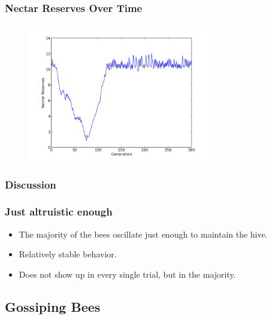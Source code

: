 \documentclass{beamer}
\begin{document}
        \begin{frame}[t]\frametitle{Nectar Reserves Over Time}
          \begin{figure}
          \includegraphics[width=8cm]{recurrent_bees_nectar.png}
          \end{figure}
        \end{frame}

      \subsubsection{Discussion} %
      \label{ssub:discussion}
        \begin{frame}[c]\frametitle{Just altruistic enough}
            
          \begin{itemize}
            \item The majority of the bees oscillate just enough to maintain 
                  the hive.
            \item Relatively stable behavior.
            \item Does not show up in every single trial, but in the majority.
          \end{itemize}
        
        \end{frame}


    \subsection{Gossiping Bees} %
    \label{sub:gossipping_bees}
    
\end{document}
